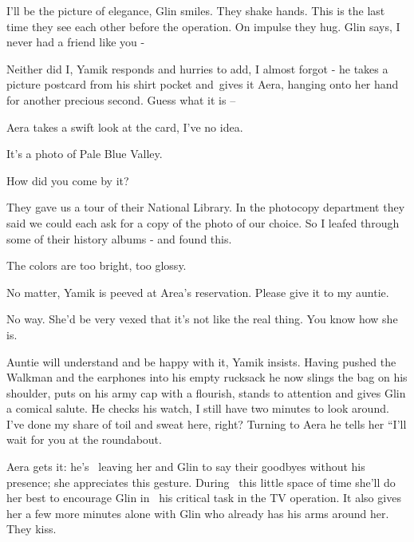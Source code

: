 \documentclass[letterpaper]{article}
\begin{document}
{\textquotedbl}I'll be the picture of elegance,{\textquotedbl} Glin smiles. They shake hands. This is the last time they
see each other before the operation. On impulse they hug. Glin says, {\textquotedbl}I never had a friend like you
-{\textquotedbl} 

{\textquotedbl}Neither did I,{\textquotedbl} Yamik responds and hurries to add, {\textquotedbl}I almost forgot
-{\textquotedbl} he takes a picture postcard from his shirt pocket and~gives it Aera, hanging onto her hand for another
precious second. {\textquotedbl}Guess what it is --{\textquotedbl} 

Aera takes a swift look at\textcolor{red}{ }the card, {\textquotedbl}I've no idea.{\textquotedbl} 

{\textquotedbl}It's a photo of Pale Blue Valley.{\textquotedbl} 

{\textquotedbl}How did you come by it?{\textquotedbl} 

{\textquotedbl}They gave us a tour of their National Library. In the photocopy department they said we could each ask
for a copy of the photo of our choice. So I leafed through some of their history albums - and found
this.{\textquotedbl} 

{\textquotedbl}The colors are too bright, too glossy.{\textquotedbl} 

{\textquotedbl}No matter,{\textquotedbl} Yamik is peeved at Area's reservation. {\textquotedbl}Please give it to my
auntie.{\textquotedbl} 

{\textquotedbl}No way. She'd be very vexed that it's not like the real thing. You know how she is.{\textquotedbl} 

{\textquotedbl}Auntie will understand and be happy with it,{\textquotedbl} Yamik insists. Having pushed the Walkman and
the earphones into his empty rucksack he now slings the bag on his shoulder, puts on his army cap with a flourish,
stands to attention and gives Glin a comical salute. He checks his watch, {\textquotedbl}I still have two minutes to
look around. I've done my share of toil and sweat here, right?{\textquotedbl} Turning to Aera he tells her ``I'll wait
for you at the roundabout.{\textquotedbl}

Aera gets it: he's \ leaving her and Glin to say their goodbyes without his presence; she appreciates this gesture.
During \ this little space of time she'll do her best to encourage Glin in \ his critical task in the TV operation. It
also gives her a few more minutes alone with Glin who already has his arms around her. They kiss. 
\end{document}
